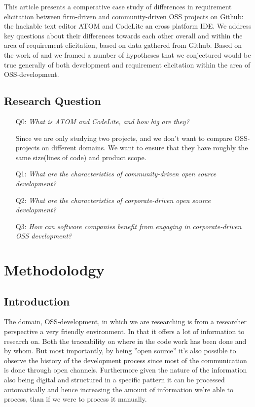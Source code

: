 \documentclass[a4paper,11pt]{article}
\begin{document}
{This article presents a comperative case study of differences in requirement elicitation between firm-driven and community-driven OSS projects on Github: the hackable text editor ATOM and CodeLite an cross platform IDE. We address key questions about their differences towards each other overall and within the area of requirement elicitation, based on data gathered from Github. Based on the work of \cite{Mockus2002a} and \cite{Noll} we framed a number of hypotheses that we conjectured would be true generally of both development and requirement elicitation within the area of OSS-development. 


\subsection{Research Question}
\begin{itemize}
	\item[Q0:]\emph{What is ATOM and CodeLite, and how big are they?} 
	
	Since we are only studying two projects, and we don't want to compare OSS-projects on different domains. We want to ensure that they have roughly the same size(lines of code) and product scope.
	\item[Q1:]\emph{What are the characteristics of community-driven open source development?}
	\item[Q2:]\emph{What are the characteristics of corporate-driven open source development?}
	\item[Q3:]\emph{How can software companies benefit from engaging in corporate-driven OSS development?}
\end{itemize}

\section{Methodolodgy}
\subsection{Introduction}
The domain, OSS-development, in which we are researching is from a researcher perspective a very friendly environment. In that it offers a lot of information to research on. Both the traceability on where in the code work has been done and by whom. But most importantly, by being ''open source'' it's also possible to observe the history of the development process since most of the communication is done through open channels. Furthermore given the nature of the information also being digital and structured in a specific pattern it can be processed automatically and hence increasing the amount of information we're able to process, than if we were to process it manually.

}
\end{document}

